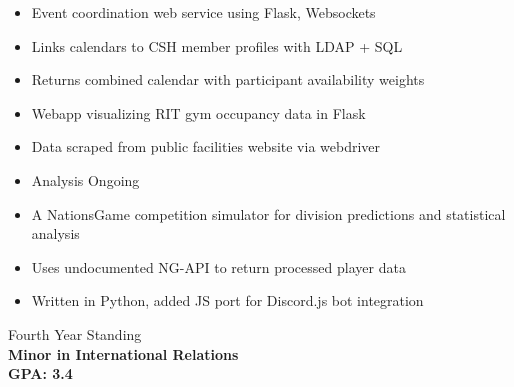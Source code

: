 \documentclass[10pt,a4paper,ragged2e,withhyper]{altacv}
\begin{document}
\begin{paracol}{2}
\begin{itemize}
    \item Event coordination web service using Flask, Websockets
    \item Links calendars to CSH member profiles with LDAP + SQL
    \item Returns combined calendar with participant availability weights
\end{itemize}

\divider

\begin{itemize}
    \item Webapp visualizing RIT gym occupancy data in Flask
    \item Data scraped from public facilities website via webdriver
    \item Analysis Ongoing
\end{itemize}

\divider


\begin{itemize}
    \item A NationsGame competition simulator for division predictions and statistical analysis
    \item Uses undocumented NG-API to return processed player data
    \item Written in Python, added JS port for Discord.js bot integration
\end{itemize}\par

\medskip

\switchcolumn


Fourth Year Standing\\
\textbf{Minor in International Relations}\\
\textbf{GPA: 3.4}

\medskip


\par\smallskip
{}
\par\smallskip
{}
\par\medskip


\end{paracol}
\end{document}
